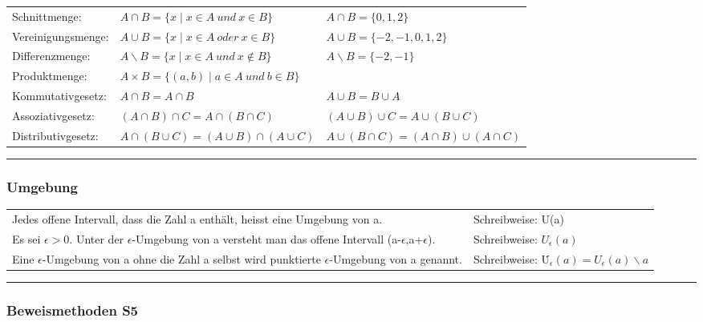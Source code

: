 \begin{tabulary}{12cm}{LLL}
	
Schnittmenge: 		& $A\cap B = \{x\mid x \in A\ und\ x\in B\}$ 				& 	$A\cap B = \{0,1,2\}$ 			\\
Vereinigungsmenge: 	& $A\cup B = \{x\mid x \in A\ oder\ x\in B\}$ 				& 	$A\cup B = \{-2,-1,0,1,2\}$		\\ 
Differenzmenge: 	& $A\smallsetminus B = \{x\mid x \in A\ und\ x\notin B\}$ 	& 	$A\smallsetminus B = \{-2,-1\}$	\\
Produktmenge: 		& $A\times B = \{(a,b)\mid a \in A\ und\ b\in B\}$ 			&									\\ 
Kommutativgesetz:	& $A\cap B = A\cap B$ 										&	$A\cup B = B\cup A$				\\
Assoziativgesetz: 	& $(A\cap B) \cap C = A \cap(B\cap C)$ 						&	$(A\cup B)\cup C = A\cup (B\cup C)$	\\
Distributivgesetz:	& $A \cap (B \cup C) = (A\cup B)\cap (A\cup C)$				&	$A \cup (B \cap C) = (A\cap B)\cup (A\cap C)$\\
\end{tabulary}
\hrule

\subsubsection{Umgebung} %
\color{black}
\label{sub:allgemeines}

\begin{tabulary}{12cm}{ll}
Jedes offene Intervall, dass die Zahl a enthält, heisst eine Umgebung von a. & Schreibweise: U(a) \\
Es sei $\epsilon  > 0$. Unter der $\epsilon $-Umgebung von a versteht man das offene Intervall (a-$\epsilon $,a+$ \epsilon $). & Schreibweise: $U_{\epsilon }(a)$ \\
Eine $\epsilon$-Umgebung von a ohne die Zahl a selbst wird punktierte $\epsilon$-Umgebung von a genannt.& Schreibweise: \.{U}$_{\epsilon}(a)= U_{\epsilon}(a) \smallsetminus a $ \\

\end{tabulary}
\hrule

\subsubsection{Beweismethoden \color{red} S5} %
\color{black}
\label{sub:allgemeines}
